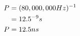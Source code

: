 \documentclass[preview,border=3mm]{standalone}
\begin{document}
\begin{align}
    P &= (80,000,000 Hz)^{-1}\cr
      &= 12.5^{-9}s\cr
    P &= 12.5ns
\end{align}
\end{document}

